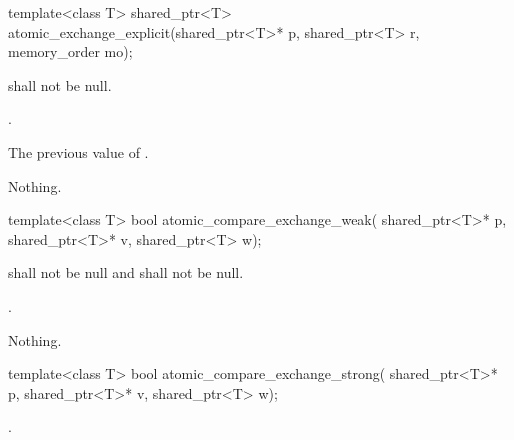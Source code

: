 %
%
\begin{itemdecl}
template<class T>
  shared_ptr<T> atomic_exchange_explicit(shared_ptr<T>* p, shared_ptr<T> r,
                                         memory_order mo);
\end{itemdecl}

\begin{itemdescr}
\pnum
\requires {} shall not be null.

\pnum
\effects {}.

\pnum
\returns The previous value of .

\pnum
\throws Nothing.
\end{itemdescr}

%
%
\begin{itemdecl}
template<class T>
  bool atomic_compare_exchange_weak(
    shared_ptr<T>* p, shared_ptr<T>* v, shared_ptr<T> w);
\end{itemdecl}

\begin{itemdescr}
\pnum
\requires {} shall not be null and  shall not be null.

\pnum
\returns {}.

\pnum
\throws Nothing.
\end{itemdescr}

%
%
\begin{itemdecl}
template<class T>
  bool atomic_compare_exchange_strong(
    shared_ptr<T>* p, shared_ptr<T>* v, shared_ptr<T> w);
\end{itemdecl}

\begin{itemdescr}
\pnum
\returns {}
.
\end{itemdescr}

